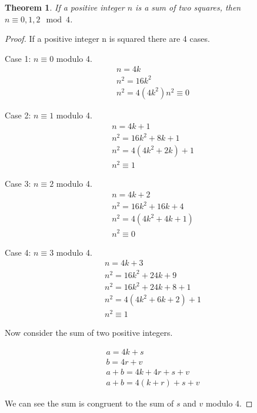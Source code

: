\documentclass[12pt]{article}
\newtheorem{thm}{Theorem}[section]
\begin{document}
\begin{thm} If a positive integer $n$ is a sum of two squares, then $n\equiv 0,1,2\mod 4$. 
\end{thm}
\begin{proof}
    If a positive integer n is squared there are 4 cases.
    
    Case 1: $n \equiv 0$ modulo 4.
    \begin{gather}
        n = 4k\\ 
        n^2 = 16k^2\\
        n^2 = 4(4k^2)
        n^2 \equiv 0
    \end{gather}

    Case 2: $n \equiv 1$ modulo 4.
    \begin{gather}
        n = 4k + 1\\
        n^2 = 16k^2 + 8k + 1\\
        n^2 = 4(4k^2 + 2k) + 1\\
        n^2 \equiv 1
    \end{gather}

    Case 3: $n \equiv 2$ modulo 4.
    \begin{gather}
        n = 4k + 2\\
        n^2 = 16k^2 + 16k + 4\\
        n^2 = 4(4k^2 + 4k + 1)\\
        n^2 \equiv 0
    \end{gather}

    Case 4: $n \equiv 3$ modulo 4.
    \begin{gather}
        n = 4k + 3\\
        n^2 = 16k^2 + 24k + 9\\
        n^2 = 16k^2 + 24k + 8 + 1\\
        n^2 = 4(4k^2 + 6k + 2) + 1\\
        n^2 \equiv 1
    \end{gather}

    Now consider the sum of two positive integers.

    \begin{gather}
        a = 4k + s\\
        b = 4r + v\\
        a + b = 4k + 4r + s + v\\
        a + b = 4(k + r) + s + v
    \end{gather}

    We can see the sum is congruent to the sum of $s$ and $v$
    modulo 4.


\end{proof}
\end{document}
